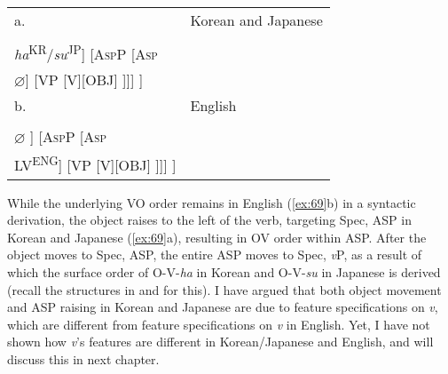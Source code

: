 \ea\label{ex:69}
 \begin{tabular}[t]{ll}
 a. & Korean and Japanese  \\
   & \begin{forest}
  [\textit{v}P [SUB] 
  [\textit{v}$'$ [\textit{v}\textsuperscript{[+\textsc{epp}]} \\ \textit{ha}\textsuperscript{KR}/\textit{su}\textsuperscript{JP}]
  [A\textsc{sp}P [A\textsc{sp} \\ $\varnothing$]
  [VP [V][OBJ] ]]] ]
  \end{forest}
  \\
b. & English \\
& \begin{forest}
  [\textit{v}P [SUB] 
  [\textit{v}$'$ [\textit{v}\textsuperscript{[-\textsc{epp}]} \\ $\varnothing$ ]
  [A\textsc{sp}P [A\textsc{sp} \\ LV\textsuperscript{ENG}]
  [VP [V][OBJ] ]]] ]
  \end{forest}  
 \end{tabular}
\z


While the underlying \ac{VO} order remains in English (\ref{ex:69}b) in a syntactic derivation, the object raises to the left of the verb, targeting Spec, \ac{ASP} in Korean and Japanese (\ref{ex:69}a), resulting in \ac{OV} order within \ac{ASP}. After the object moves to Spec, \ac{ASP}, the entire \ac{ASP} moves to Spec, \textit{v}P, as a result of which the surface order of O-V-\textit{ha} in Korean and O-V-\textit{su} in Japanese is derived (recall the structures in  and  for this). I have argued that both object movement and \ac{ASP} raising in Korean and Japanese are due to feature specifications on \textit{v}, which are different from feature specifications on \textit{v} in English. Yet, I have not shown how \textit{v}’s features are different in Korean/Japanese and English, and will discuss this in next chapter.
